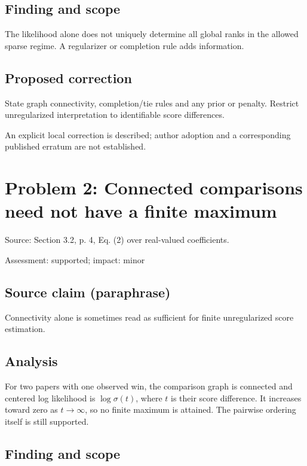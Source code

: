\documentclass[11pt]{article}
\begin{document}
\subsection*{Finding and scope}

The likelihood alone does not uniquely determine all global ranks in the allowed sparse regime. A regularizer or completion rule adds information.

\subsection*{Proposed correction}

State graph connectivity, completion/tie rules and any prior or penalty. Restrict unregularized interpretation to identifiable score differences.

An explicit local correction is described; author adoption and a corresponding published erratum are not established.

\section*{Problem 2: Connected comparisons need not have a finite maximum}

Source: Section 3.2, p. 4, Eq. (2) over real-valued coefficients.

Assessment: supported; impact: minor

\subsection*{Source claim (paraphrase)}

Connectivity alone is sometimes read as sufficient for finite unregularized score estimation.

\subsection*{Analysis}

For two papers with one observed win, the comparison graph is connected and centered log likelihood is \(\log\sigma(t)\), where \(t\) is their score difference. It increases toward zero as \(t\to\infty\), so no finite maximum is attained. The pairwise ordering itself is still supported.

\subsection*{Finding and scope}
\end{document}
